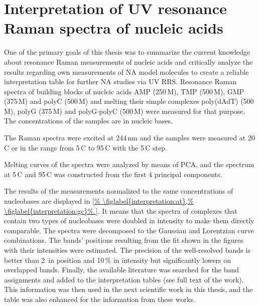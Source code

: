 \section{Interpretation of UV resonance Raman spectra of nucleic acids}
\label{interpretation}

\newlength{\assignwnl}
\settowidth{\assignwnl}{0000}
\newlength{\assignwnil}
\settowidth{\assignwnil}{(000)}
\newlength{\assignwnspl}
\setlength{\assignwnspl}{0.2cm}
\newlength{\assigntabrowindent}
\setlength{\assigntabrowindent}{.7em}


One of the primary goals of this thesis was to summarize the current knowledge
about resonance Raman measurements of nucleic acids and critically analyze the
results regarding own measurements of NA model molecules to
create a reliable interpretation table for further NA studies via UV RRS.
Resonance Raman spectra of building blocks of nucleic acids AMP (250\,M),
TMP (500\,M), GMP (375\,M) and polyC (500\,M) and melting their
simple complexes poly(dAdT) (500\,M), polyG (375\,M) and
polyG$\cdot$polyC (500\,M) were measured for that purpose.
The concentrations of the samples are in nucleic bases.

The Raman spectra were excited at 244\,nm and the samples were measured at
20\,\textdegree{}C or in the range from 5\,\textdegree{}C to 95\,\textdegree{}C
with the 5\,\textdegree{}C step.

Melting curves of the spectra were analyzed by means of PCA, and the spectrum
at 5\,\textdegree{}C and 95\,\textdegree{}C was constructed from the first 4
principal components.

The results of the measurements normalized to the same concentrations of
nucleobases are displayed in
\cref{%
	\figlabel{interpretation:at},%
	\figlabel{interpretation:gc}%
}.
It means that the spectra of complexes that contain two types of nucleobases
were doubled in intensity to make them directly comparable.
The spectra were decomposed to the Gaussian and Lorentzian curve combinations.
The bands' positions resulting from the fit shown in the figures with their
intensities were estimated.
The precision of the well-resolved bands is better than 2\,\icm{} in position
and 10\,\% in intensity but significantly lowers on overlapped bands.
Finally, the available literature was searched for the band assignments and
added to the interpretation tables (see full text of the work).
This information was then used in the next scientific work in this thesis, and
the table was also enhanced for the information from these works.


